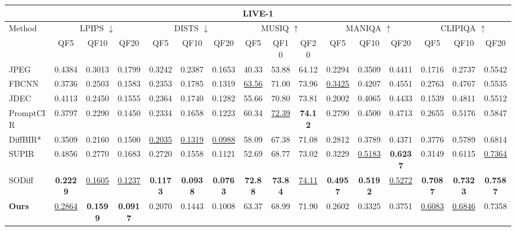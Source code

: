\documentclass[conference,letterpaper]{IEEEtran}
\newcommand{\best}[1]{\textbf{#1}}
\newcommand{\second}[1]{\underline{#1}}
\begin{document}
\begin{strip}
\begin{minipage}{\textwidth}
\centering
{}
\label{tab:quality}
\scriptsize
\setlength{\tabcolsep}{2.5pt}
\renewcommand{\arraystretch}{0.85}
\begin{tabular*}{\textwidth}{@{\extracolsep{\fill}}l|ccc|ccc|ccc|ccc|ccc@{}}
\toprule
\multicolumn{16}{c}{\textbf{LIVE-1}}\\
\midrule
\multirow{2}{*}{Method} & \multicolumn{3}{c|}{LPIPS $\downarrow$} & \multicolumn{3}{c|}{DISTS $\downarrow$} & \multicolumn{3}{c|}{MUSIQ $\uparrow$} & \multicolumn{3}{c|}{MANIQA $\uparrow$} & \multicolumn{3}{c}{CLIPIQA $\uparrow$}\\
& QF5&QF10&QF20&QF5&QF10&QF20&QF5&QF10&QF20&QF5&QF10&QF20&QF5&QF10&QF20\\
\midrule
JPEG & 0.4384&0.3013&0.1799&0.3242&0.2387&0.1653&40.33&53.88&64.12&0.2294&0.3509&0.4411&0.1716&0.2737&0.5542\\
FBCNN & 0.3736&0.2503&0.1583&0.2353&0.1785&0.1319&\second{63.56}&71.00&73.96&\second{0.3425}&0.4207&0.4551&0.2763&0.4767&0.5535\\
JDEC & 0.4113&0.2450&0.1555&0.2364&0.1740&0.1282&55.66&70.80&73.81&0.2002&0.4065&0.4433&0.1539&0.4811&0.5512\\
PromptCIR & 0.3797&0.2290&0.1450&0.2334&0.1658&0.1223&60.34&\second{72.39}&\best{74.12}&0.2790&0.4500&0.4713&0.2655&0.5176&0.5847\\
DiffBIR* & 0.3509&0.2160&0.1500&\second{0.2035}&\second{0.1319}&\second{0.0988}&58.09&67.38&71.08&0.2812&0.3789&0.4371&0.3776&0.5789&0.6814\\
SUPIR & 0.4856&0.2770&0.1683&0.2720&0.1558&0.1121&52.69&68.77&73.02&0.3229&\second{0.5183}&\best{0.6237}&0.3149&0.6115&\second{0.7364}\\
SODiff & \best{0.2229}&\second{0.1605}&\second{0.1237}&\best{0.1173}&\best{0.0938}&\best{0.0763}&\best{72.88}&\best{73.84}&\second{74.11}&\best{0.4957}&\best{0.5192}&\second{0.5272}&\best{0.7087}&\best{0.7323}&\best{0.7587}\\
\textbf{Ours} & \second{0.2864}&\best{0.1599}&\best{0.0917}&0.2070&0.1443&0.1008&63.37&68.99&71.90&0.2602&0.3325&0.3751&\second{0.6083}&\second{0.6846}&0.7358\\
\midrule

\end{tabular*}
\end{minipage}
\end{strip}
\end{document}

